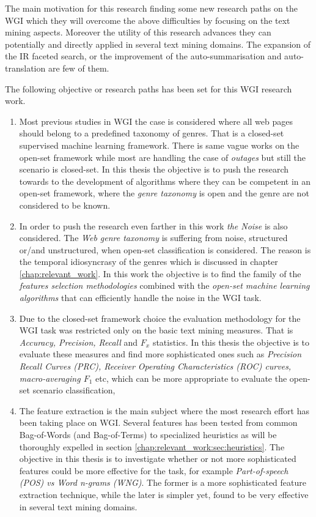 The main motivation for this research finding some new research paths on the WGI which they will overcome the above difficulties by focusing on the text mining aspects. Moreover the utility of this research advances they can potentially and directly applied in several text mining domains. The expansion of the IR faceted search, or the improvement of the auto-summarisation and auto-translation are few of them. 

The following objective or research paths has been set for this WGI research work.

\begin{enumerate}
\item  Most previous studies in WGI the case is considered where all web pages should belong to a predefined taxonomy of genres. That is a closed-set supervised machine learning framework. There is same vague works on the open-set framework while most are handling the case of \textit{outages} but still the scenario is closed-set. In this thesis the objective is to push the research towards to the development of algorithms where they can be competent in an open-set framework, where the \textit{genre taxonomy} is open and the genre are not considered to be known. 
\item In order to push the research even farther in this work \textit{the Noise} is also considered. The \textit{Web genre taxonomy} is suffering from noise, structured or/and unstructured, when open-set classification is considered.  The reason is the temporal idiosyncrasy of the genres which is discussed in chapter \ref{chap:relevant_work}. In this work the objective is to find the family of the \textit{features selection methodologies} combined with the \textit{open-set machine learning algorithms} that can efficiently handle the noise in the WGI task. 
\item Due to the closed-set framework choice the evaluation methodology for the WGI task was restricted only on the basic text mining measures. That is \textit{Accuracy, Precision, Recall} and $F_{x}$ statistics. In this thesis the objective is to evaluate these measures and find more sophisticated ones such as \textit{Precision Recall Curves (PRC), Receiver Operating Characteristics (ROC) curves, macro-averaging $F_{1}$} etc, which can be more appropriate to evaluate the open-set scenario classification, 
\item The feature extraction is the main subject where the most research effort has been taking place on WGI. Several features has been tested from common Bag-of-Words (and Bag-of-Terms) to specialized heuristics as will be thoroughly expelled in section \ref{chap:relevant_work:sec:heuristics}. The objective in this thesis is to investigate whether or not more sophisticated features could be more effective for the task, for example \textit{Part-of-speech (POS) vs Word n-grams (WNG)}. The former is a more sophisticated feature extraction technique, while the later is simpler yet, found to be very effective in several text mining domains.

\end{enumerate}
